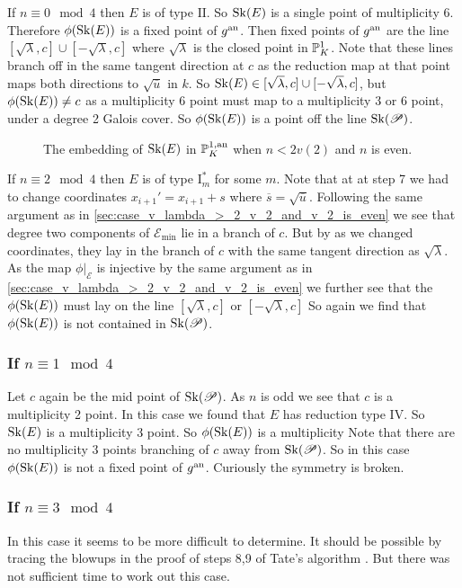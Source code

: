 \medskip

If  $n \equiv 0 \mod 4$ then $E$ is of type $\mathrm{II}$.  
So $\operatorname{Sk}(E)$ is a single point of multiplicity 6. 
Therefore  $\phi(\sk(E))$ is a fixed point of $g{}^{\text{an}}$. 
Then fixed points of $g{}^{\text{an}}$ are the line  $[\sqrt{\lambda}, c] \cup [-\sqrt{\lambda} , c]$ where $\sqrt{\lambda} $ is the closed point in $\mathbb{P}^{1}_K$. 
Note that these lines branch off in the same tangent direction at $c$ as the reduction map at that point maps both directions to  $\sqrt{\overline{u}} $ in $k$. 
So $\operatorname{Sk}(E) \in [\sqrt{\lambda}, c] \cup [-\sqrt{\lambda}, c] $, but $\phi(\sk(E)) \ne c$ as a multiplicity 6 point must map to a multiplicity 3 or 6 point, under a degree 2 Galois cover. 
So $\phi(\sk(E))$ is a point off the line $\operatorname{Sk}(\mathscr P)$. 

\begin{figure}[h]
    \centering
    \caption{The embedding of $\operatorname{Sk}(E)$ in $\mathbb{P}^{1, \text{an}}_K$ when $n < 2v(2)$ and  $n$ is even.}
    \label{fig:image-skeleton-wild-n-le-2v2-n-even}
\end{figure}
\medskip 
If $n \equiv 2 \mod 4$ then $E$ is of type $\mathrm I_{m}^*$ for some $m$. 
Note that at at step 7 we had to change coordinates $x_{i+1}' = x_{i + 1}  + s$ where $\overline{s} = \sqrt{\overline{u}} $. 
Following the same argument as in \cref{sec:case_v_lambda_>_2_v_2_and_v_2_is_even} we see that degree two components of $\mathscr E_\text{min} $ lie in a branch of $c$. 
But by as we changed coordinates, they lay in the branch of $c$ with the same tangent direction as $\sqrt{\lambda} $. 
As the map $\phi|_{\mathscr E}$ is injective by the same argument as in \cref{sec:case_v_lambda_>_2_v_2_and_v_2_is_even} we further see that the $\phi(\sk(E))$ must lay on the line $[\sqrt{\lambda}, c] $ or $[-\sqrt{\lambda} , c]$
So again we find that $\phi(\sk (E))$ is not contained in $\operatorname{Sk}(\mathscr P)$. 


\subsubsection{If $n \equiv 1 \mod 4$} \label{sec:if_n_equiv_1_mod_4$}

Let $c$ again be the mid point of $\operatorname{Sk}(\mathscr P)$. 
As $n$ is odd we see that $c$ is a multiplicity 2 point. 
In this case we found that $E$ has reduction type $\mathrm{IV}$. 
So $\operatorname{Sk}(E)$ is a multiplicity 3 point. 
So $\phi(\sk(E))$ is a multiplicity 
Note that there are no multiplicity 3 points branching of $c$ away from $\operatorname{Sk}(\mathscr P)$. 
So in this case  $\phi(\sk(E))$ is not a fixed point of $g{}^{\text{an}}$.  
Curiously the symmetry is broken. 


\subsubsection{If $n \equiv 3 \mod 4$ } \label{sec:if_n_equiv_3_mod_4}
In this case it seems to be more difficult to determine. 
It should be possible by tracing the blowups in the proof of steps 8,9 of Tate's algorithm \cite[p. 374-376]{silvermanAdvancedTopicsArithmetic1994}.
But there was not sufficient time to work out this case. 

